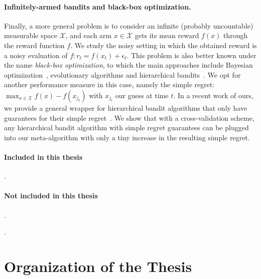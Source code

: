 \paragraph{Infinitely-armed bandits and black-box optimization.} Finally, a more general problem is to consider an infinite (probably uncountable) measurable space $\mathcal{X}$, and each arm $x\in\mathcal{X}$ gets its mean reward $f(x)$ through the reward function $f$. We study the noisy setting in which the obtained reward is a noisy evaluation of $f: r_t = f(x_t) + \epsilon_t$. This problem is also better known under the name \emph{black-box optimization}, to which the main approaches include Bayesian optimization~\citep{brochu2010bayesian}, evolutionary algorithms and hierarchical bandits~\citep{bubeck2010x}. We opt for another performance measure in this case, namely the simple regret: $\max_{x\in\mathcal{X}} f(x) - f(x_{j_t})$ with $x_{j_t}$ our guess at time $t$. In a recent work of ours, we provide a general wrapper for hierarchical bandit algorithms that only have guarantees for their simple regret~\cite{shang2019adaptive}. We show that with a cross-validation scheme, any hierarchical bandit algorithm with simple regret guarantees can be plugged into our meta-algorithm with only a tiny increase in the resulting simple regret.

\paragraph{Included in this thesis}

\cite{shang2018adaptive,shang2019dttts,shang2019adaptive,shang2020dttts,degenne2020game,shang2020t3c}.

\paragraph{Not included in this thesis}

\cite{shang2020vector,shang2021safe,menard2021ucbmq}.

\cite{rlberry2021}.

\section{Organization of the Thesis}\label{sec:intro.organization}

% 
% 
